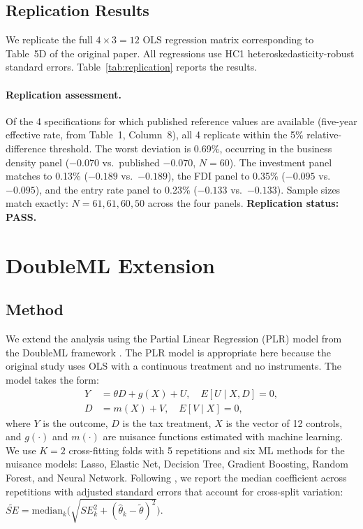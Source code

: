 \documentclass[12pt]{article}
\begin{document}
\subsection{Replication Results}

We replicate the full $4 \times 3 = 12$ OLS regression matrix corresponding to
Table~5D of the original paper. All regressions use HC1 heteroskedasticity-robust
standard errors. Table~\ref{tab:replication} reports the results.



\paragraph{Replication assessment.}
Of the 4 specifications for which published reference values are
available (five-year effective rate, from \citealt{baiardi2024} Table~1, Column~8),
all 4 replicate within the 5\% relative-difference threshold.
The worst deviation is 0.69\%, occurring in the business density
panel ($-0.070$ vs.\ published $-0.070$, $N = 60$). The investment panel matches
to 0.13\% ($-0.189$ vs.\ $-0.189$), the FDI panel to 0.35\% ($-0.095$ vs.\ $-0.095$),
and the entry rate panel to 0.23\% ($-0.133$ vs.\ $-0.133$). Sample sizes match exactly:
$N = 61, 61, 60, 50$ across the four panels.
\textbf{Replication status: PASS.}

\section{DoubleML Extension}

\subsection{Method}

We extend the analysis using the Partial Linear Regression (PLR) model from the
DoubleML framework \citep{chernozhukov2018}. The PLR model is appropriate here
because the original study uses OLS with a continuous treatment and no instruments.
The model takes the form:
\begin{align}
  Y &= \theta D + g(X) + U, \quad E[U \mid X, D] = 0, \\
  D &= m(X) + V, \quad E[V \mid X] = 0,
\end{align}
where $Y$ is the outcome, $D$ is the tax treatment, $X$ is the vector of 12
controls, and $g(\cdot)$ and $m(\cdot)$ are nuisance functions estimated with
machine learning. We use $K = 2$ cross-fitting folds with 5 repetitions and six ML
methods for the nuisance models: Lasso, Elastic Net, Decision Tree, Gradient
Boosting, Random Forest, and Neural Network. Following \citet{baiardi2024}, we
report the median coefficient across repetitions with adjusted standard errors
that account for cross-split variation:
$\widetilde{SE} = \text{median}_k\!\bigl(\sqrt{SE_k^2 + (\hat\theta_k - \tilde\theta)^2}\bigr)$.
\end{document}
